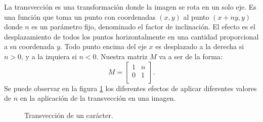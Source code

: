 			La transvección es una transformación donde la imagen se rota en un solo eje. Es una función que toma un punto con coordenadas $(x,y)$ al punto $(x +ny, y)$ donde $n$ es un parámetro fijo, denominado el factor de inclinación. El efecto es el desplazamiento de todos los puntos horizontalmente en una cantidad proporcional a su coordenada $y$. Todo punto encima del eje $x$ es desplazado a la derecha si $n > 0$, y a la izquiera si $n < 0$. Nuestra matriz $M$ va a ser de la forma:
			\begin{equation}
				M = 
				\begin{bmatrix}
					1 & n \\
					0 & 1 \\
				\end{bmatrix}.
			\end{equation}
		Se puede observar en la figura \ref{fig: Transformacion Afin - Transveccion} los diferentes efectos de aplicar diferentes valores de $n$ en la aplicación de la transvección en una imagen.
		\begin{figure}[htbp]
			\centering
			\caption[Transvección de un caracter]{Transvección de un carácter.}
			\label{fig: Transformacion Afin - Transveccion}
		\end{figure}	
		
